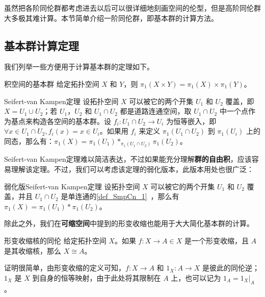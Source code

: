 

虽然把各阶同伦群都考虑进去以后可以很详细地刻画空间的伦型，但是高阶同伦群大多极其难计算。本节简单介绍一阶同伦群，即基本群的计算方法。

\subsection{基本群计算定理}

我们列举一些方便用于计算基本群的定理如下。

\begin{theorem}{积空间的基本群}
给定拓扑空间 $X$ 和 $Y$，则 $\pi_1(X\times Y)=\pi_1(X)\times\pi_1(Y)$。
\end{theorem}

\begin{theorem}{Seifert-van Kampen定理}
设拓扑空间 $X$ 可以被它的两个开集 $U_1$ 和 $U_2$ 覆盖，即 $X=U_1\cup U_2$；若 $U_1$，$U_2$ 和 $U_1\cap U_2$ 都是道路连通空间，取 $U_1\cap U_2$ 中一个点作为基点来构造各空间的基本群。设 $f_i:U_1\cap U_2\rightarrow U_i$ 为恒等嵌入，即 $\forall x\in U_1\cap U_2, f_i(x)=x\in U_i$。如果用 $f_i$ 来定义 $\pi_1(U_1\cap U_2)$ 到 $\pi_1(U_i)$ 上的同态，那么有：$\pi_1(X)=\pi_1(U_1)*_{\pi_1(U_1\cap U_2)}\pi_1(U_2)$。
\end{theorem}

Seifert-van Kampen定理难以简洁表达，不过如果能充分理解\textbf{群的自由积}，应该容易理解该定理。不过，我们可以考虑该定理的弱化版本，此版本用处也很广泛：

\begin{theorem}{弱化版Seifert-van Kampen定理}
设拓扑空间 $X$ 可以被它的两个开集 $U_1$ 和 $U_2$ 覆盖，并且 $U_1\cap U_2$ 是单连通的\autoref{def_SmpCn_1}~，那么有 $\pi_1(X)=\pi_1(U_1)*\pi_1(U_2)$。
\end{theorem}

除此之外，我们在\textbf{可缩空间}中提到的形变收缩也能用于大大简化基本群的计算。

\begin{theorem}{形变收缩核的同伦}\label{the_HomT5_1}
给定拓扑空间 $X$。如果 $f:X\rightarrow A\in X$ 是一个形变收缩，且 $A$ 是其收缩核，那么 $X\cong A$。
\end{theorem}

证明很简单，由形变收缩的定义可知，$f:X\rightarrow A$ 和 $1_X:A\rightarrow X$ 是彼此的同伦逆；$1_X$ 是 $X$ 到自身的恒等映射，由于此处将其限制在 $A$ 上，也可以记为 $1_A=1_X|_A$。

